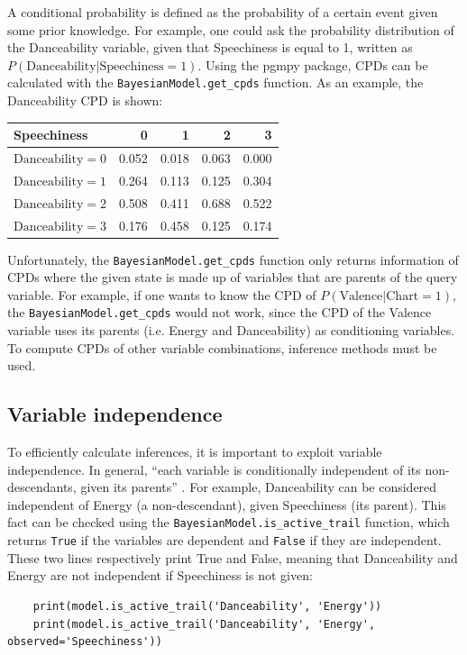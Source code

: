 \documentclass[a4paper, 12pt]{article}
\begin{document}
A conditional probability is defined as the probability of a certain event given some prior knowledge. For example, one could ask the probability distribution of the Danceability variable, given that Speechiness is equal to 1, written as $P\left(\mathrm{Danceability} | \mathrm{Speechiness} = 1\right)$. Using the pgmpy package, CPDs can be calculated with the \verb|BayesianModel.get_cpds| function. As an example, the Danceability CPD is shown:
\begin{center}
    \begin{tabular}{lrrrr}
        \toprule
        Speechiness                 & 0     & 1     & 2     & 3     \\
        \midrule
        $\mathrm{Danceability} = 0$ & 0.052 & 0.018 & 0.063 & 0.000 \\
        $\mathrm{Danceability} = 1$ & 0.264 & 0.113 & 0.125 & 0.304 \\
        $\mathrm{Danceability} = 2$ & 0.508 & 0.411 & 0.688 & 0.522 \\
        $\mathrm{Danceability} = 3$ & 0.176 & 0.458 & 0.125 & 0.174 \\
        \bottomrule
    \end{tabular}
\end{center}

Unfortunately, the \verb|BayesianModel.get_cpds| function only returns information of CPDs where the given state is made up of variables that are parents of the query variable. For example, if one wants to know the CPD of $P\left(\mathrm{Valence} | \mathrm{Chart} = 1\right)$, the \verb|BayesianModel.get_cpds| would not work, since the CPD of the Valence variable uses its parents (i.e. Energy and Danceability) as conditioning variables. To compute CPDs of other variable combinations, inference methods must be used.


\subsection{Variable independence}

To efficiently calculate inferences, it is important to exploit variable independence. In general, ``each variable is conditionally independent of its non-descendants, given its parents'' \cite{probabilistic-reasoning}. For example, Danceability can be considered independent of Energy (a non-descendant), given Speechiness (its parent). This fact can be checked using the \verb|BayesianModel.is_active_trail| function, which returns \verb|True| if the variables are dependent and \verb|False| if they are independent. These two lines respectively print True and False, meaning that Danceability and Energy are not independent if Speechiness is not given:
\begin{verbatim}
    print(model.is_active_trail('Danceability', 'Energy'))
    print(model.is_active_trail('Danceability', 'Energy', observed='Speechiness'))
\end{verbatim}
\end{document}
